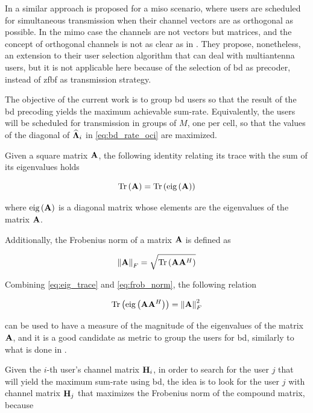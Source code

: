 In \cite{yoo06} a similar approach is proposed for a \gls{miso} scenario, where
users are scheduled for simultaneous transmission when their channel vectors are
as orthogonal as possible. In the \gls{mimo} case the channels are not vectors
but matrices, and the concept of orthogonal channels is not as clear as in
\cite{yoo06}. They propose, nonetheless, an extension to their user selection
algorithm that can deal with multiantenna users, but it is not applicable here
because of the selection of \gls{bd} as precoder, instead of \gls{zfbf} as
transmission strategy.

The objective of the current work is to group \gls{bd} users so that the result
of the \gls{bd} precoding yields the maximum achievable sum-rate. Equivalently,
the users will be scheduled for transmission in groups of $M$, \ie one per cell,
so that the values of the diagonal of $\bLambdahat_i$ in \eqref{eq:bd_rate_oci}
are maximized.

Given a square matrix $\AA$, the following identity relating its trace with the
sum of its eigenvalues holds

\begin{equation} \label{eq:eig_trace}
    \Tr\left(\AA\right) = \Tr\left(\text{eig}\left(\AA\right)\right)
\end{equation}

\noindent
where $\text{eig}\left(\AA\right)$ is a diagonal matrix whose elements are the
eigenvalues of the matrix $\AA$.

Additionally, the Frobenius norm of a matrix $\AA$ is defined as

\begin{equation} \label{eq:frob_norm}
    \left\|\AA\right\|_F = \sqrt{\Tr\left(\AA\AA^H\right)}
\end{equation}

Combining \eqref{eq:eig_trace} and \eqref{eq:frob_norm}, the following relation

\begin{equation} \label{eq:eig_frob}
    \Tr\left(\text{eig}\left(\AA\AA^H\right)\right) = \left\|\AA\right\|_F^2
\end{equation}

\noindent
can be used to have a measure of the magnitude of the eigenvalues of the matrix
$\AA$, and it is a good candidate as metric to group the users for \gls{bd},
similarly to what is done in \cite{shen06}.

Given the $i$-th user's channel matrix $\HH_i$, in order to search for the user
$j$ that will yield the maximum sum-rate using \gls{bd}, the idea is to look for
the user $j$ with channel matrix $\HH_j$ that maximizes the Frobenius norm of
the compound matrix, because

